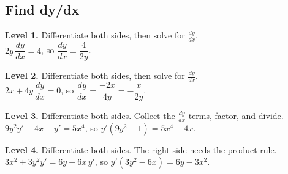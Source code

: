 \documentclass[11pt]{article}
\begin{document}
\subsection*{Find dy/dx}
\noindent\textbf{Level 1.} Differentiate both sides, then solve for $\frac{dy}{dx}$.\\  \quad $2y\,\dfrac{dy}{dx}=4$, so $\dfrac{dy}{dx}=\dfrac{4}{2y}$.\par\medskip
\noindent\textbf{Level 2.} Differentiate both sides, then solve for $\frac{dy}{dx}$.\\  \quad $2x+4y\,\dfrac{dy}{dx}=0$, so $\dfrac{dy}{dx}=\dfrac{-2x}{4y}=-\dfrac{x}{2y}$.\par\medskip
\noindent\textbf{Level 3.} Differentiate both sides. Collect the $\frac{dy}{dx}$ terms, factor, and divide.\\  \quad $9y^{2}y'+4x-y'=5x^{4}$, so $y'(9y^{2}-1)=5x^{4}-4x$.\par\medskip
\noindent\textbf{Level 4.} Differentiate both sides. The right side needs the product rule.\\  \quad $3x^{2}+3y^{2}y'=6y+6x\,y'$, so $y'(3y^{2}-6x)=6y-3x^{2}$.\par\medskip
\end{document}
